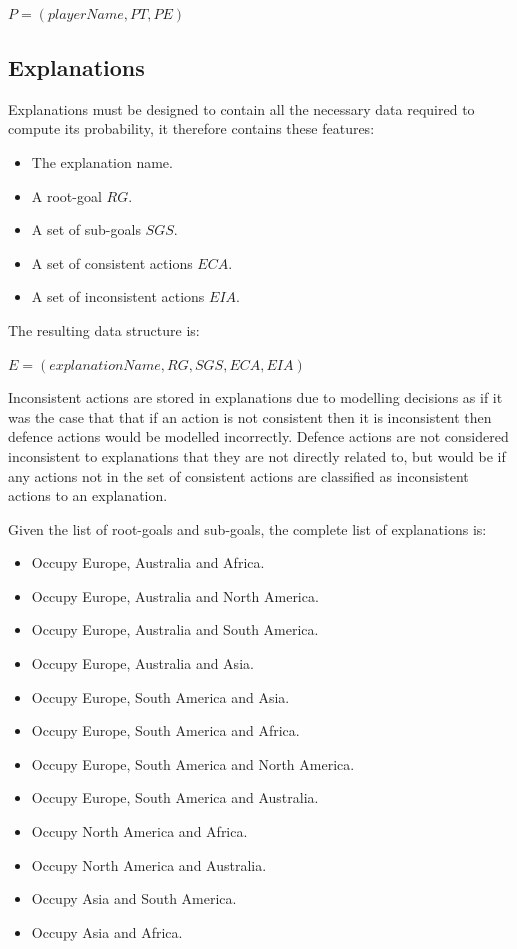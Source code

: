 \documentclass[parskip]{cs4rep}
\begin{document}
\centerline{
$P = ( playerName, PT, PE )$
}

\subsection{Explanations}

Explanations must be designed to contain all the necessary data required to compute its probability, it therefore contains these features:

\begin{itemize}
\item
The explanation name.
\item
A root-goal $RG$.
\item
A set of sub-goals $SGS$.
\item
A set of consistent actions $ECA$.
\item
A set of inconsistent actions $EIA$.
\end{itemize}

The resulting data structure is:\newline

\centerline{
$E = ( explanationName, RG, SGS, ECA, EIA )$
}

Inconsistent actions are stored in explanations due to modelling decisions as if it was the case that that if an action is not consistent then it is inconsistent then defence actions would be modelled incorrectly. Defence actions are not considered inconsistent to explanations that they are not directly related to, but would be if any actions not in the set of consistent actions are classified as inconsistent actions to an explanation.

Given the list of root-goals and sub-goals, the complete list of explanations is:

\begin{itemize}
\item
Occupy Europe, Australia and Africa.
\item
Occupy Europe, Australia and North America.
\item
Occupy Europe, Australia and South America.
\item
Occupy Europe, Australia and Asia.
\item
Occupy Europe, South America and Asia.
\item
Occupy Europe, South America and Africa.
\item
Occupy Europe, South America and North America.
\item
Occupy Europe, South America and Australia.
\item
Occupy North America and Africa.
\item
Occupy North America and Australia.
\item
Occupy Asia and South America.
\item
Occupy Asia and Africa.
\end{itemize}
\end{document}

